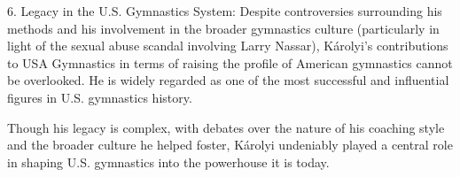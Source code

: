 \documentclass{mcmthesis}
\begin{document}
\begin{enumerate}
\begin{description}
			6. Legacy in the U.S. Gymnastics System:
			Despite controversies surrounding his methods and his involvement in the broader gymnastics culture (particularly in light of the sexual abuse scandal involving Larry Nassar), Károlyi's contributions to USA Gymnastics in terms of raising the profile of American gymnastics cannot be overlooked. He is widely regarded as one of the most successful and influential figures in U.S. gymnastics history.
			
			Though his legacy is complex, with debates over the nature of his coaching style and the broader culture he helped foster, Károlyi undeniably played a central role in shaping U.S. gymnastics into the powerhouse it is today.
		\end{description}
		
	
		
	\end{enumerate}
	
	\clearpage
	\setcounter{page}{\value{lastpage}}
	
	
	
	
	
	
\end{document}
